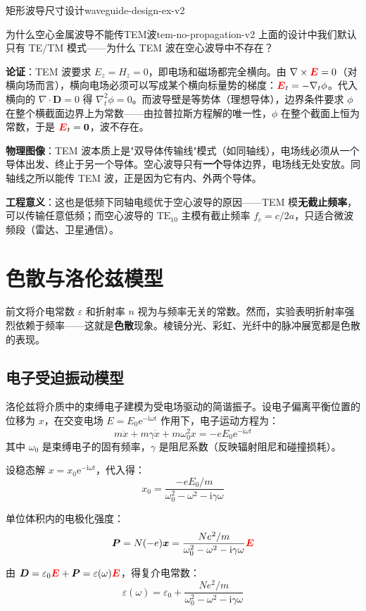 \documentclass[11pt,a4paper,openany,oneside]{book}
\newcommand{\vecE}{\textcolor{red}{\vect{E}}}
\newcommand{\ii}{\mathrm{i}}
\newcommand{\ee}{\mathrm{e}}
\newcommand{\eps}{\varepsilon}
\newcommand{\vect}[1]{\bm{#1}}
\newcommand{\grad}{\nabla}
\newcommand{\curl}{\nabla\times}
\newcommand{\divg}{\nabla\cdot}
\newcommand{\lap}{\nabla^2}
\begin{document}
\begin{example}{矩形波导尺寸设计}{waveguide-design-ex-v2}
\begin{insight}{为什么空心金属波导不能传TEM波}{tem-no-propagation-v2}
上面的设计中我们默认只有 TE/TM 模式——为什么 TEM 波在空心波导中不存在？

\textbf{论证}：TEM 波要求 $E_z = H_z = 0$，即电场和磁场都完全横向。由 $\curl\vecE = 0$（对横向场而言），横向电场必须可以写成某个横向标量势的梯度：$\vecE_t = -\grad_t\phi$。代入横向的 $\divg\vect{D} = 0$ 得 $\lap_t\phi = 0$。而波导壁是等势体（理想导体），边界条件要求 $\phi$ 在整个横截面边界上为常数——由拉普拉斯方程解的唯一性，$\phi$ 在整个截面上恒为常数，于是 $\vecE_t = \vect{0}$，波不存在。

\textbf{物理图像}：TEM 波本质上是"双导体传输线"模式（如同轴线），电场线必须从一个导体出发、终止于另一个导体。空心波导只有\textbf{一个}导体边界，电场线无处安放。同轴线之所以能传 TEM 波，正是因为它有内、外两个导体。

\textbf{工程意义}：这也是低频下同轴电缆优于空心波导的原因——TEM 模\textbf{无截止频率}，可以传输任意低频；而空心波导的 $\text{TE}_{10}$ 主模有截止频率 $f_c = c/2a$，只适合微波频段（雷达、卫星通信）。
\end{insight}
\end{example}

\section{色散与洛伦兹模型}

前文将介电常数 $\eps$ 和折射率 $n$ 视为与频率无关的常数。然而，实验表明折射率强烈依赖于频率——这就是\textbf{色散}现象。棱镜分光、彩虹、光纤中的脉冲展宽都是色散的表现。

\subsection{电子受迫振动模型}

洛伦兹将介质中的束缚电子建模为受电场驱动的简谐振子。设电子偏离平衡位置的位移为 $x$，在交变电场 $E = E_0\ee^{-\ii\omega t}$ 作用下，电子运动方程为：
\[
m\ddot{x} + m\gamma\dot{x} + m\omega_0^2 x = -e E_0\ee^{-\ii\omega t}
\]
其中 $\omega_0$ 是束缚电子的固有频率，$\gamma$ 是阻尼系数（反映辐射阻尼和碰撞损耗）。

设稳态解 $x = x_0\ee^{-\ii\omega t}$，代入得：
\[
x_0 = \frac{-eE_0/m}{\omega_0^2 - \omega^2 - \ii\gamma\omega}
\]

单位体积内的电极化强度：
\[
\vect{P} = N(-e)\vect{x} = \frac{Ne^2/m}{\omega_0^2 - \omega^2 - \ii\gamma\omega}\vecE
\]

由 $\vect{D} = \eps_0\vecE + \vect{P} = \eps(\omega)\vecE$，得复介电常数：
\[
\eps(\omega) = \eps_0 + \frac{Ne^2/m}{\omega_0^2 - \omega^2 - \ii\gamma\omega}
\]
\end{document}

